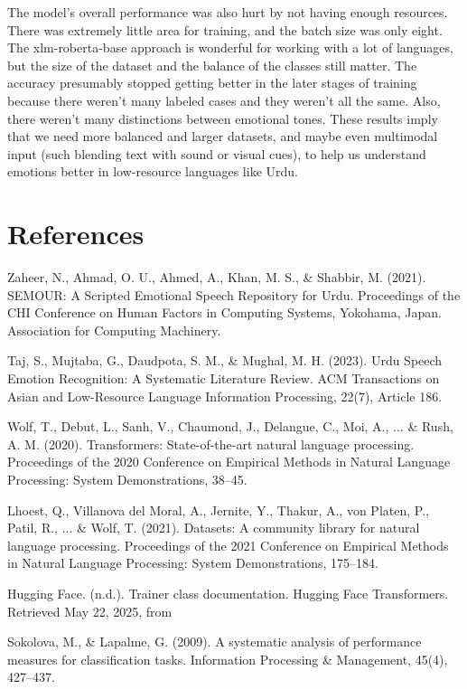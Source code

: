\documentclass[12pt]{article}
\begin{document}
The model's overall performance was also hurt by not having enough resources.   There was extremely little area for training, and the batch size was only eight.   The xlm-roberta-base approach is wonderful for working with a lot of languages, but the size of the dataset and the balance of the classes still matter.   The accuracy presumably stopped getting better in the later stages of training because there weren't many labeled cases and they weren't all the same. Also, there weren't many distinctions between emotional tones.   These results imply that we need more balanced and larger datasets, and maybe even multimodal input (such blending text with sound or visual cues), to help us understand emotions better in low-resource languages like Urdu.

\section*{References}

Zaheer, N., Ahmad, O. U., Ahmed, A., Khan, M. S., & Shabbir, M. (2021). SEMOUR: A Scripted Emotional Speech Repository for Urdu. Proceedings of the CHI Conference on Human Factors in Computing Systems, Yokohama, Japan. Association for Computing Machinery.

Taj, S., Mujtaba, G., Daudpota, S. M., & Mughal, M. H. (2023). Urdu Speech Emotion Recognition: A Systematic Literature Review. ACM Transactions on Asian and Low-Resource Language Information Processing, 22(7), Article 186.

Wolf, T., Debut, L., Sanh, V., Chaumond, J., Delangue, C., Moi, A., ... & Rush, A. M. (2020). Transformers: State-of-the-art natural language processing. Proceedings of the 2020 Conference on Empirical Methods in Natural Language Processing: System Demonstrations, 38–45.

Lhoest, Q., Villanova del Moral, A., Jernite, Y., Thakur, A., von Platen, P., Patil, R., ... & Wolf, T. (2021). Datasets: A community library for natural language processing. Proceedings of the 2021 Conference on Empirical Methods in Natural Language Processing: System Demonstrations, 175–184.

Hugging Face. (n.d.). Trainer class documentation. Hugging Face Transformers. Retrieved May 22, 2025, from

Sokolova, M., & Lapalme, G. (2009). A systematic analysis of performance measures for classification tasks. Information Processing & Management, 45(4), 427–437.
\end{document}
